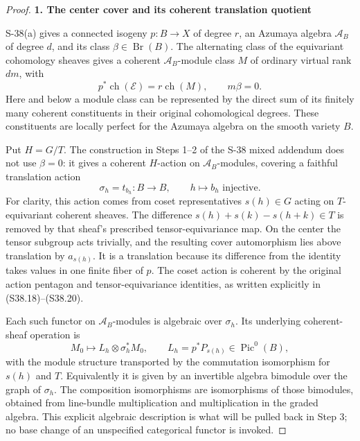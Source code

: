 \documentclass[11pt,a4paper]{article}
\theoremstyle{definition}
\begin{document}
\begin{proof}
\par

\medskip\noindent\textbf{1. The center cover and its coherent translation quotient}\quad

S-38(a) gives a connected isogeny \(p:B\to X\) of degree \(r\), an Azumaya algebra \(\mathscr A_B\) of degree \(d\), and its class \(\beta\in\operatorname{Br}(B)\). The alternating class of the equivariant cohomology sheaves gives a coherent \(\mathscr A_B\)-module class \(M\) of ordinary virtual rank \(dm\), with \[
 p^*\operatorname{ch}(\mathcal E)=r\operatorname{ch}(M),
 \qquad m\beta=0.
 \tag{S41.6}
\] Here and below a module class can be represented by the direct sum of its finitely many coherent constituents in their original cohomological degrees. These constituents are locally perfect for the Azumaya algebra on the smooth variety \(B\).

Put \(H=G/T\). The construction in Steps 1--2 of the S-38 mixed addendum does not use \(\beta=0\): it gives a coherent \(H\)-action on \(\mathscr A_B\)-modules, covering a faithful translation action \[
 \sigma_h=t_{b_h}:B\longrightarrow B,
 \qquad h\longmapsto b_h\text{ injective}.
 \tag{S41.7}
\] For clarity, this action comes from coset representatives \(s(h)\in G\) acting on \(T\)-equivariant coherent sheaves. The difference \(s(h)+s(k)-s(h+k)\in T\) is removed by that sheaf's prescribed tensor-equivariance map. On the center the tensor subgroup acts trivially, and the resulting cover automorphism lies above translation by \(a_{s(h)}\). It is a translation because its difference from the identity takes values in one finite fiber of \(p\). The coset action is coherent by the original action pentagon and tensor-equivariance identities, as written explicitly in (S38.18)--(S38.20).

Each such functor on \(\mathscr A_B\)-modules is algebraic over \(\sigma_h\). Its underlying coherent-sheaf operation is \[
 M_0\longmapsto L_h\otimes\sigma_h^*M_0,
 \qquad L_h=p^*P_{s(h)}\in\operatorname{Pic}^0(B),
 \tag{S41.8}
\] with the module structure transported by the commutation isomorphism for \(s(h)\) and \(T\). Equivalently it is given by an invertible algebra bimodule over the graph of \(\sigma_h\). The composition isomorphisms are isomorphisms of those bimodules, obtained from line-bundle multiplication and multiplication in the graded algebra. This explicit algebraic description is what will be pulled back in Step 3; no base change of an unspecified categorical functor is invoked.


\end{proof}
\end{document}
